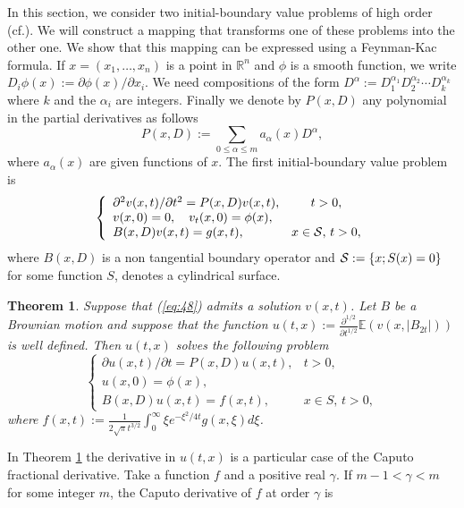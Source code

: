 \documentclass[a4paper, 11pt]{article}
\newtheorem{thm}{Theorem}%
\newcommand{\R}{\mathbb{R}}
\newcommand{\E}{\mathbb{E}}
\newcommand{\1}{\mathbf{1}}
\begin{document}
\noindent In this section, we consider two initial-boundary value problems of high order (cf.\cite{bragg}). We will construct a mapping  that transforms one of these problems into the other one. We show that this mapping can be expressed using a Feynman-Kac formula. If  $x=(x_1,\ldots,x_n)$ is a point in ${\R}^n$ and  $\phi$ is a smooth function, we write $D_i\phi(x):=\partial \phi(x)/\partial x_i$. We need compositions of the form $D^\alpha:=D_1^{\alpha_1}D_2^{\alpha_2}\cdots D_k^{\alpha_k}$ where $k$ and the $\alpha_i$ are integers. Finally we denote by $P(x,D)$ any polynomial in the partial derivatives as follows
\begin{equation*}
P(x,D):=\sum_{0\leq\alpha \leq m }a_\alpha(x)D^\alpha,
\end{equation*}
where $a_\alpha(x)$ are given functions of $x$. The first initial-boundary value problem is
\begin{equation}\label{eq:48}
\left\lbrace 
\begin{array}{lcl} 
\partial^2 v(x,t)/\partial t^2=P(x,D)v(x,t), &t>0,\\
v(x,0)=0, \quad v_t(x,0)=\phi(x),\\
B(x,D)v(x,t)=g(x,t),&x\in {\cal S},\, t>0,
\end{array}\right.
\end{equation}
\noindent where $B(x,D)$ is a non tangential boundary operator and ${\cal S}:=\{ x; S(x)=0\}$ for some function $S$, denotes a cylindrical surface. 

\begin{thm}\label{transform}
Suppose that (\ref{eq:48})  admits a solution $v(x,t)$. Let $B$ be a Brownian motion and suppose that the function $u(t,x):=\frac{\partial^{1/2}}{\partial t^{1/2}}\E (v(x,|B_{2t}|))$ is well defined. Then $u(t,x)$ solves the following problem
\begin{equation}\label{eq:49}
\left\lbrace 
\begin{array}{lcl} 
\partial u(x,t)/\partial t=P(x,D)u(x,t), &t>0,\\
u(x,0)=\phi(x),\\
B(x,D)u(x,t)=f(x,t),&x\in S,\, t>0,
\end{array}\right.
\end{equation}
where $f(x,t):=\frac{1}{2\sqrt{\pi}t^{3/2}}\int_0^\infty\xi e^{-\xi^2/4t}g(x,\xi)d\xi$.
\end{thm}
In Theorem \ref{transform} the derivative in $u(t,x)$ is a particular case of the Caputo fractional derivative. Take a function $f$ and a positive real $\gamma$. If $m-1<\gamma<m$ for some integer $m$, the Caputo derivative of $f$ at order $\gamma$ is  
\end{document}
